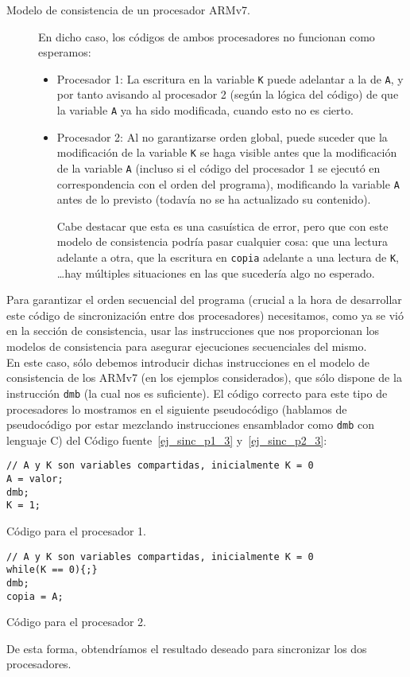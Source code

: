 \begin{ejemplo}
\begin{description}
    \item [Modelo de consistencia de un procesador ARMv7.] En dicho caso, los códigos de ambos procesadores no funcionan como esperamos:
        \begin{itemize}
            \item Procesador 1: La escritura en la variable \verb|K| puede adelantar a la de \verb|A|, y por tanto avisando al procesador 2 (según la lógica del código) de que la variable \verb|A| ya ha sido modificada, cuando esto no es cierto.
            \item Procesador 2: Al no garantizarse orden global, puede suceder que la modificación de la variable \verb|K| se haga visible antes que la modificación de la variable \verb|A| (incluso si el código del procesador 1 se ejecutó en correspondencia con el orden del programa), modificando la variable \verb|A| antes de lo previsto (todavía no se ha actualizado su contenido). 

                Cabe destacar que esta es una casuística de error, pero que con este modelo de consistencia podría pasar cualquier cosa: que una lectura adelante a otra, que la escritura en \verb|copia| adelante a una lectura de \verb|K|, \ldots hay múltiples situaciones en las que sucedería algo no esperado.
        \end{itemize}
\end{description}
Para garantizar el orden secuencial del programa (crucial a la hora de desarrollar este código de sincronización entre dos procesadores) necesitamos, como ya se vió en la sección de consistencia, usar las instrucciones que nos proporcionan los modelos de consistencia para asegurar ejecuciones secuenciales del mismo.\\

En este caso, sólo debemos introducir dichas instrucciones en el modelo de consistencia de los ARMv7 (en los ejemplos considerados), que sólo dispone de la instrucción \verb|dmb| (la cual nos es suficiente). El código correcto para este tipo de procesadores lo mostramos en el siguiente pseudocódigo (hablamos de pseudocódigo por estar mezclando instrucciones ensamblador como \verb|dmb| con lenguaje C) del Código fuente~\ref{ej_sinc_p1_3} y~\ref{ej_sinc_p2_3}:
\begin{listing}[H]
\centering
\begin{verbatim}
// A y K son variables compartidas, inicialmente K = 0
A = valor;
dmb;
K = 1;
\end{verbatim}
\caption{Código para el procesador 1.}
\label{ej_sinc_p1_3}
\end{listing}
\begin{listing}[H]
\centering
\begin{verbatim}
// A y K son variables compartidas, inicialmente K = 0
while(K == 0){;}
dmb;
copia = A;
\end{verbatim}
\caption{Código para el procesador 2.}
\label{ej_sinc_p2_3}
\end{listing}

De esta forma, obtendríamos el resultado deseado para sincronizar los dos procesadores.

\end{ejemplo}
